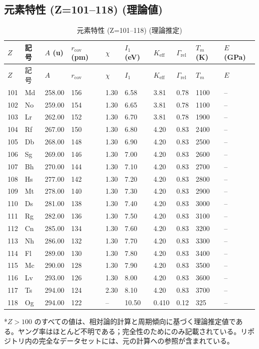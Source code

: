 \documentclass[11pt,a4paper]{article}
\newcommand{\Keff}{K_{\mathrm{eff}}}
\theoremstyle{remark}
\begin{document}
	\subsection*{元素特性 (Z=101–118) (理論値)}
	
	\begin{longtable}{p{0.6cm}p{1.2cm}p{1.2cm}p{1.2cm}p{1.2cm}p{1.2cm}p{1.5cm}p{1.2cm}p{1.2cm}p{1.2cm}}
		\caption{元素特性 (Z=101–118) (理論推定)} \label{tab:elem-data-101to118} \\
		\toprule
		\(Z\) & 記号 & \(A\) (u) & \(r_{\text{cov}}\) (pm) & \(\chi\) & \(I_1\) (eV) & \(\Keff\) & \(\Gamma_{\text{rel}}\) & \(T_m\) (K) & \(E\) (GPa) \\
		\midrule
		\endfirsthead
		\toprule
		\(Z\) & 記号 & \(A\) & \(r_{\text{cov}}\) & \(\chi\) & \(I_1\) & \(\Keff\) & \(\Gamma_{\text{rel}}\) & \(T_m\) & \(E\) \\
		\midrule
		\endhead
		101 & Md & 258.00 & 156 & 1.30 & 6.58 & 3.81 & 0.78 & 1100 & – \\
		102 & No & 259.00 & 154 & 1.30 & 6.65 & 3.81 & 0.78 & 1100 & – \\
		103 & Lr & 262.00 & 152 & 1.30 & 6.70 & 3.81 & 0.78 & 1900 & – \\
		104 & Rf & 267.00 & 150 & 1.30 & 6.80 & 4.20 & 0.83 & 2400 & – \\
		105 & Db & 268.00 & 148 & 1.30 & 6.90 & 4.20 & 0.83 & 2500 & – \\
		106 & Sg & 269.00 & 146 & 1.30 & 7.00 & 4.20 & 0.83 & 2600 & – \\
		107 & Bh & 270.00 & 144 & 1.30 & 7.10 & 4.20 & 0.83 & 2700 & – \\
		108 & Hs & 277.00 & 142 & 1.30 & 7.20 & 4.20 & 0.83 & 2800 & – \\
		109 & Mt & 278.00 & 140 & 1.30 & 7.30 & 4.20 & 0.83 & 2900 & – \\
		110 & Ds & 281.00 & 138 & 1.30 & 7.40 & 4.20 & 0.83 & 3000 & – \\
		111 & Rg & 282.00 & 136 & 1.30 & 7.50 & 4.20 & 0.83 & 3100 & – \\
		112 & Cn & 285.00 & 134 & 1.30 & 7.60 & 4.20 & 0.83 & 3200 & – \\
		113 & Nh & 286.00 & 132 & 1.30 & 7.70 & 4.20 & 0.83 & 3300 & – \\
		114 & Fl & 289.00 & 130 & 1.30 & 7.80 & 4.20 & 0.83 & 3400 & – \\
		115 & Mc & 290.00 & 128 & 1.30 & 7.90 & 4.20 & 0.83 & 3500 & – \\
		116 & Lv & 293.00 & 126 & 1.30 & 8.00 & 4.20 & 0.83 & 3600 & – \\
		117 & Ts & 294.00 & 124 & 2.30 & 8.10 & 4.20 & 0.83 & 3700 & – \\
		118 & Og & 294.00 & 122 & –    & 10.50 & 0.410 & 0.12 & 325 & – \\
		\bottomrule
	\end{longtable}
	*\(Z>100\) のすべての値は、相対論的計算と周期傾向に基づく理論推定値である。ヤング率はほとんど不明である；完全性のためにのみ記載されている。リポジトリ内の完全なデータセットには、元の計算への参照が含まれている。
	
\end{document}
